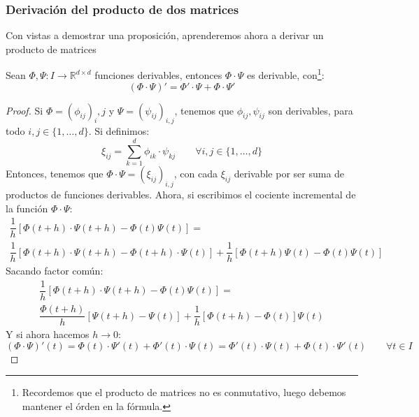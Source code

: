 \subsubsection{Derivación del producto de dos matrices}
Con vistas a demostrar una proposición, aprenderemos ahora a derivar un producto de matrices
\begin{lema}\label{lema:prop_deriv}
    Sean $\Phi,\Psi:I\rightarrow\mathbb{R}^{d\times d}$ funciones derivables, entonces $\Phi\cdot \Psi$ es derivable, con\footnote{Recordemos que el producto de matrices no es conmutativo, luego debemos mantener el órden en la fórmula.}:
    \begin{equation*}
        (\Phi\cdot \Psi)' = \Phi'\cdot \Psi + \Phi\cdot \Psi'
    \end{equation*}
    \begin{proof}
        Si $\Phi={(\phi_{ij})}_i,j$ y $\Psi={(\psi_{ij})}_{i,j}$, tenemos que $\phi_{ij},\psi_{ij}$ son derivables, para todo $i,j\in \{1,\ldots,d\}$. Si definimos:
        \begin{equation*}
            \xi_{ij} = \sum_{k=1}^d \phi_{ik}\cdot  \psi_{kj} \qquad \forall i,j \in \{1,\ldots,d\}
        \end{equation*}
        Entonces, tenemos que $\Phi\cdot \Psi = {(\xi_{ij})}_{i,j}$, con cada $\xi_{ij}$ derivable por ser suma de productos de funciones derivables. Ahora, si escribimos el cociente incremental de la función $\Phi\cdot \Psi$:
        \begin{multline*}
            \dfrac{1}{h}[\Phi(t+h)\cdot \Psi(t+h) - \Phi(t)\Psi(t)] =\\ \dfrac{1}{h} [\Phi(t+h)\cdot \Psi(t+h)-\Phi(t+h)\cdot \Psi(t)] + \dfrac{1}{h} [\Phi(t+h)\Psi(t)-\Phi(t)\Psi(t)]
        \end{multline*}
        Sacando factor común:
        \begin{multline*}
            \dfrac{1}{h}[\Phi(t+h)\cdot \Psi(t+h) - \Phi(t)\Psi(t)] =\\ \dfrac{\Phi(t+h)}{h} [\Psi(t+h)-\Psi(t)] + \dfrac{1}{h} [\Phi(t+h)-\Phi(t)] \Psi(t)
        \end{multline*}
        Y si ahora hacemos $h\rightarrow 0$:
        \begin{equation*}
            (\Phi\cdot \Psi)'(t) = \Phi(t)\cdot \Psi'(t) + \Phi'(t) \cdot \Psi(t) =  \Phi'(t)\cdot \Psi(t) +  \Phi(t) \cdot \Psi'(t)  \qquad \forall t\in I
        \end{equation*}
    \end{proof}
\end{lema}


